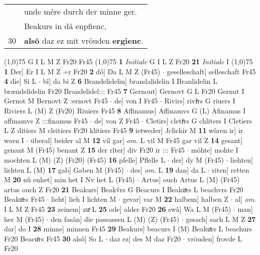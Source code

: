 \documentclass[8pt,a4paper,notitlepage]{article}
\begin{document}
\begin{table}[ht]
\begin{minipage}[t]{0.5\linewidth}
\begin{tabular}{rl}
 & unde mêre durch der minne ger.\\ 
 & Beakurs in dâ enpfienc,\\ 
30 & \textbf{alsô} daz ez mit vröuden \textbf{ergienc}.\\ 
\end{tabular}
\scriptsize
\line(1,0){75} \newline
G I L M Z Fr20 Fr45 \newline
\line(1,0){75} \newline
\textbf{1} \textit{Initiale} G I L Z Fr20  \textbf{21} \textit{Initiale} I  \newline
\line(1,0){75} \newline
\textbf{1} Der] Er I L M Z ÷r Fr20 \textbf{2} dô] Da L M Z (Fr45)  $\cdot$ geselleschaft] selleschaft Fr45 \textbf{4} die] Si L  $\cdot$ bî] da bi Z \textbf{6} Brandelidelin] brandalidelin I Branlidelin L brændelidelin Fr20 Brandelidel::: Fr45 \textbf{7} Gernout] Gernovt G L Fr20 Gernut I Gernot M Bernovt Z :ernovt Fr45  $\cdot$ de] von I Fr45  $\cdot$ Rivirs] riviͤrs G riuers I Riviers L (M) Z (Fr20) Riuiers Fr45 \textbf{8} Affinamus] Affinamvs G (L) Afinamus I affmamvs Z :::finamus Fr45  $\cdot$ de] von Z Fr45  $\cdot$ Cletirs] cletiͤrs G chliters I Cletiers L Z ditiers M cleitiers Fr20 klitiers Fr45 \textbf{9} ietweder] Jclichir M \textbf{11} wâren ir] ir warn I  $\cdot$ überal] beider al M \textbf{12} vil gar] \textit{om.} L vil M Fr45 gar vil Z \textbf{14} gesant] genant M (Fr45) benant Z \textbf{15} der rîter] div Fr20 ir ::: Fr45  $\cdot$ möhte] mohte I mochten L (M) (Z) (Fr20) (Fr45) \textbf{16} pfelle] Pflelle L  $\cdot$ der] dy M (Fr45)  $\cdot$ liehten] lichten L (M) \textbf{17} gab] Gaben M (Fr45)  $\cdot$ des] \textit{om.} L \textbf{19} dan] da L  $\cdot$ riten] retten M \textbf{20} nû enhet] min het I Nv het L (Fr45)  $\cdot$ Artus] ouch Artus L (M) (Fr45) artus ouch Z Fr20 \textbf{21} Beakurs] Beakv̂rs G Beacurs I Beakuͯrs L beachvrs Fr20 Beakuͦrs Fr45  $\cdot$ lieht] lieh I lichten M  $\cdot$ gevar] var M \textbf{22} halbem] halben Z  $\cdot$ al] \textit{om.} I L M Z Fr45 \textbf{23} zeinem] zuͯ L \textbf{25} ode] alder Fr20 \textbf{26} swâ] Wa L M (Fr45)  $\cdot$ man] her M (Fr45)  $\cdot$ den fasân] die passassen L (M) (Z) (Fr45)  $\cdot$ gesach] sach L M Z \textbf{27} dar] do I \textbf{28} minne] minnen Fr45 \textbf{29} Beakurs] beacurs I (M) Beakuͯrs L beachurs Fr20 Beacuͦrs Fr45 \textbf{30} alsô] So L  $\cdot$ daz ez] des M daz Fr20  $\cdot$ vröuden] frovde L Fr20 \newline
\end{minipage}

\end{table}
\end{document}
